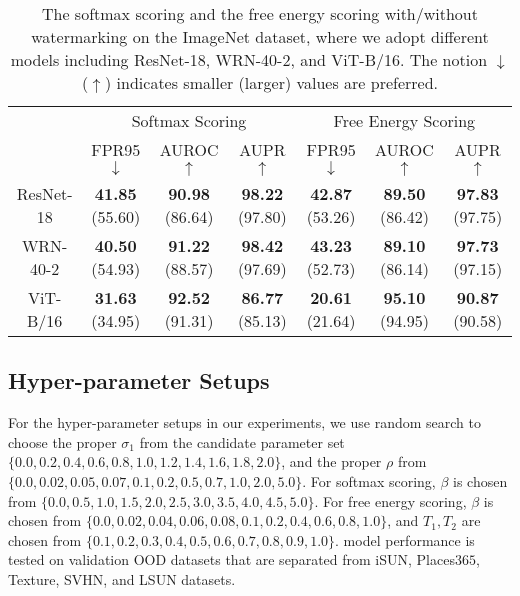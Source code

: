 \documentclass{article}
\begin{document}
\begin{table}[]
\centering
\caption{{The softmax scoring and the free energy scoring with/without watermarking on the ImageNet dataset, where we adopt different models including ResNet-18, WRN-40-2, and ViT-B/16. The notion $\downarrow$ ($\uparrow$) indicates smaller (larger) values are preferred.}} \label{tab: vit}
\scriptsize{
\begin{tabular}{c|ccc|ccc}
\toprule[1.5pt]
\multicolumn{1}{c|}{\multirow{2}{*}{}} & \multicolumn{3}{c|}{Softmax Scoring}           & \multicolumn{3}{c}{Free Energy Scoring}                   \\
\cline{2-7}
\multicolumn{1}{c|}{}                  & FPR95  $\downarrow$        & AUROC  $\uparrow$       & AUPR     $\uparrow$     & FPR95 $\downarrow$  & AUROC  $\uparrow$       & AUPR $\uparrow$         \\
\midrule[1pt]
ResNet-18                             & \textbf{41.85} (55.60) & \textbf{90.98} (86.64) & \textbf{98.22} (97.80) & \textbf{42.87} (53.26)             & \textbf{89.50} (86.42) & \textbf{97.83} (97.75) \\
WRN-40-2                              & \textbf{40.50} (54.93) & \textbf{91.22} (88.57) & \textbf{98.42} (97.69) & \textbf{43.23} (52.73)             & \textbf{89.10} (86.14) & \textbf{97.73} (97.15) \\
ViT-B/16                              & \textbf{31.63} (34.95) & \textbf{92.52} (91.31) & \textbf{86.77} (85.13) & \textbf{20.61} (21.64)             & \textbf{95.10} (94.95) & \textbf{90.87} (90.58) \\
\bottomrule[1.5pt]
\end{tabular}}
\end{table}

\subsection{Hyper-parameter Setups}
\label{app: hyper-parameter}


For the hyper-parameter setups in our experiments, we use random search to choose the proper $\sigma_1$ from the candidate parameter set $\{0.0,0.2,0.4,0.6,0.8,1.0,1.2,1.4,1.6,1.8,2.0\}$, and the proper $\rho$ from $\{0.0,0.02,0.05,0.07,0.1,0.2,0.5,0.7,1.0,2.0,5.0\}$. For softmax scoring, $\beta$ is chosen from $\{0.0,0.5,1.0,1.5,2.0,2.5,3.0,3.5,4.0,4.5,5.0\}$. For free energy scoring, $\beta$ is chosen from $\{0.0,0.02,0.04,0.06,0.08,0.1,0.2,0.4,0.6,0.8,1.0\}$, and $T_1, T_2$ are chosen from $\{0.1,0.2,0.3,0.4,0.5,0.6,0.7,0.8,0.9,1.0\}$. model performance is tested on validation OOD datasets that are separated from iSUN, Places$365$, Texture, SVHN, and LSUN datasets. 
\end{document}
